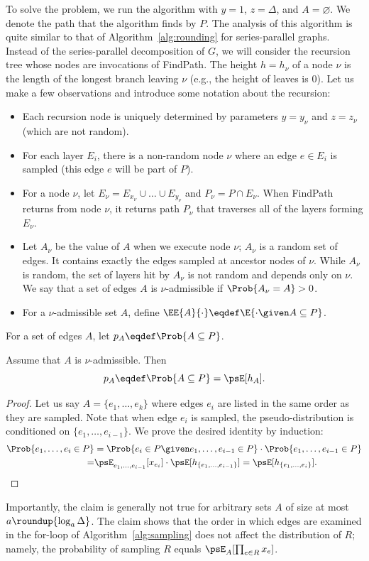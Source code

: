 \documentclass[11pt,a4paper]{article}
\begin{document}
To solve the problem, we run the algorithm with $y=1$, $z=\Delta$, and $A=\varnothing$. We denote the path that the algorithm finds by $P$.
The analysis of this algorithm is quite similar to that of Algorithm~\ref{alg:rounding} for series-parallel graphs.
Instead of the series-parallel decomposition of $G$, we will consider the recursion tree whose nodes are invocations of FindPath. The height $h = h_\nu$ of a node $\nu$ is the length of the longest branch leaving $\nu$  (e.g., the height of leaves is 0).
Let us make a few observations and introduce some notation about the recursion:
\begin{itemize}
\item Each recursion node is uniquely determined by parameters $y=y_\nu$ and $z=z_\nu$ (which are not random). 
\item For each layer $E_i$, there is a non-random node $\nu$ where an edge $e\in E_i$ is sampled (this edge $e$ will be part of $P$).
\item For a node $\nu$, let $E_\nu = E_{x_\nu}\cup \dots \cup E_{y_\nu}$ and $P_{\nu} = P\cap E_\nu$. When FindPath returns from node $\nu$, it returns path $P_\nu$ that traverses all of the layers forming $E_\nu$. 
\item Let $A_\nu$ be the value of $A$ when we execute node $\nu$; $A_\nu$ is a random set of edges. It contains exactly the edges sampled at ancestor nodes of $\nu$.
 While $A_\nu$ is random, the set of layers hit by $A_\nu$ 
 is not random and depends only on $\nu$. 
 We say that a set of edges $A$ is $\nu$-admissible if $\Prob{A_\nu = A} > 0$.
\item For a $\nu$-admissible set $A$, define $\EE{A}{\cdot} \eqdef \E{\cdot \given A\subseteq P}$.
\end{itemize}
For a set of edges $A$, let $p_A \eqdef \Prob{A\subseteq P}$.
\begin{claim}
Assume that $A$ is $\nu$-admissible. Then
$$
p_A \eqdef \Prob{A\subseteq P} = \psE[h_A].
$$
\end{claim}
\begin{proof}
Let us say $A = \{e_1,\dots, e_k\}$ where edges $e_i$ are listed in the same order as they are sampled. Note that when edge $e_i$ is sampled, the pseudo-distribution is conditioned on $\{e_1,\dots,e_{i-1}\}$. We prove the desired identity by induction:
\begin{align*}
    \Prob{e_1,\dots,e_i\in P} &= \Prob{e_i\in P\given e_1,\dots, e_{i-1}\in P} \cdot \Prob{e_1,\dots, e_{i-1}\in P} \\
    =& \psE_{e_1,\dots, e_{i-1}}[x_{e_i}] \cdot\psE[h_{\{e_1,\dots, e_{i-1}\}}] = \psE[h_{\{e_1,\dots,e_i\}}].
\end{align*}
\end{proof}
Importantly, the claim is generally not true for arbitrary sets $A$ of size at most $a\roundup{\log_a \Delta}$. The claim shows that the order in which edges are examined in the for-loop of Algorithm~\ref{alg:sampling} does not affect the distribution of $R$; namely, the probability of sampling $R$ equals $\psE_A[\prod_{e\in R}x_e]$.
\end{document}

